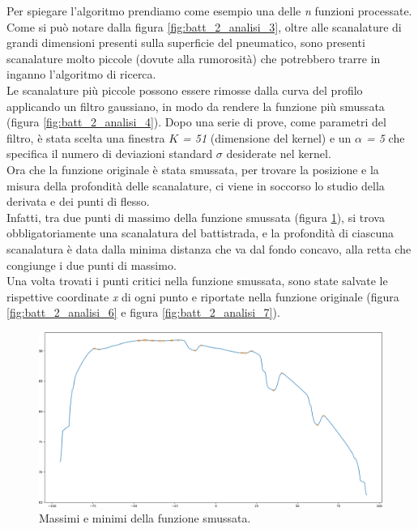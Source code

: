 \noindent Per spiegare l'algoritmo prendiamo come esempio una delle \textit{n} funzioni processate. Come si può notare dalla figura \ref{fig:batt_2_analisi_3}, oltre alle scanalature di grandi dimensioni presenti sulla superficie del pneumatico, sono presenti scanalature molto piccole (dovute alla rumorosità) che potrebbero trarre in inganno l'algoritmo di ricerca.\\
\newline
Le scanalature più piccole possono essere rimosse dalla curva del profilo applicando un filtro gaussiano, in modo da rendere la funzione  più smussata (figura \ref{fig:batt_2_analisi_4}). Dopo una serie di prove, come parametri del filtro, è stata scelta una finestra \textit{$K$ = 51} (dimensione del kernel) e un \textit{$\alpha$ = 5} che specifica il numero di deviazioni standard $\sigma$ desiderate nel kernel.\\
\newline
Ora che la funzione originale è stata smussata, per trovare la posizione e la misura della profondità delle scanalature, ci viene in soccorso lo studio della derivata e dei punti di flesso.\\
\newline
Infatti, tra due punti di massimo della funzione smussata (figura \ref{fig:batt_2_analisi_5}), si trova obbligatoriamente una scanalatura del battistrada, e la profondità di ciascuna scanalatura è data dalla minima distanza che va dal fondo concavo, alla retta che congiunge i due punti di massimo.\\
\newline
Una volta trovati i punti critici nella funzione smussata, sono state salvate le rispettive coordinate \textit{x} di ogni punto e riportate nella funzione originale (figura \ref{fig:batt_2_analisi_6} e figura \ref{fig:batt_2_analisi_7}).\\

\begin{figure}[H]
	\centering
	\includegraphics[width=0.9\columnwidth]{./pictures/batt_2_analisi_5.png}
	\caption{Massimi e minimi della funzione smussata.}\label{fig:batt_2_analisi_5}
\end{figure}

